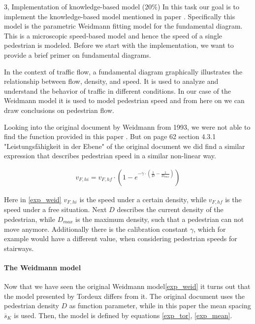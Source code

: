 \begin{task}{3, Implementation of knowledge-based model (20\%)}
In this task our goal is to implement the knowledge-based model mentioned in paper \cite{tordeux2020prediction}. Specifically this model is the parametric Weidmann fitting model for the fundamental diagram. This is a microscopic speed-based model and hence the speed of a single pedestrian is modeled. Before we start with the implementation, we want to provide a brief primer on fundamental diagrams.

In the context of traffic flow, a fundamental diagram graphically illustrates the relationship between flow, density, and speed. It is used to analyze and understand the behavior of traffic in different conditions. In our case of the Weidmann model it is used to model pedestrian speed and from here on we can draw conclusions on pedestrian flow.

Looking into the original document \cite{weidmann1993transporttechnik} by Weidmann from 1993, we were not able to find the function provided in this paper \cite{tordeux2020prediction}. But on page 62 section 4.3.1 "Leistungsfähigkeit in der Ebene" of the original document \cite{weidmann1993transporttechnik} we did find a similar expression that describes pedestrian speed in a similar non-linear way.

\begin{align}
    v_{F, hi} = v_{F, hf}\cdot\left(1-e^{-\gamma\cdot(\frac{1}{D}-\frac{1}{D_{max}})}\right)\label{exp_weid}
\end{align}

Here in \ref{exp_weid} $v_{F, hi}$ is the speed under a certain density, while $v_{F, hf}$ is the speed under a free situation. Next $D$ describes the current density of the pedestrian, while $D_{max}$ is the maximum density, such that a pedestrian can not move anymore. Additionally there is the calibration constant $\gamma$, which for example would have a different value, when considering pedestrian speeds for stairways.

\paragraph{The Weidmann model} Now that we have seen the original Weidmann model\ref{exp_weid} it turns out that the model presented by Tordeux\cite{tordeux2020prediction} differs from it. The original document uses the pedestrian density $D$ as function parameter, while in this paper\cite{tordeux2020prediction} the mean spacing $\overline{s}_K$ is used. Then, the model is defined by equations \ref{exp_tor}, \ref{exp_mean}.


\end{task}
